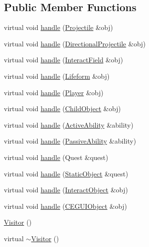 \subsection*{Public Member Functions}
\begin{DoxyCompactItemize}
\item 
virtual void \hyperlink{classZeta_1_1Visitor_aeed96aa1f8a5a6e41c27fc975971a2f8}{handle} (\hyperlink{classZeta_1_1Projectile}{Projectile} \&obj)
\item 
virtual void \hyperlink{classZeta_1_1Visitor_af0c8252665ba1a933f0c6e197c35af27}{handle} (\hyperlink{classZeta_1_1DirectionalProjectile}{Directional\+Projectile} \&obj)
\item 
virtual void \hyperlink{classZeta_1_1Visitor_a3d9eb8fcc5345717e7bca30020bb2d76}{handle} (\hyperlink{classZeta_1_1InteractField}{Interact\+Field} \&obj)
\item 
virtual void \hyperlink{classZeta_1_1Visitor_a4548e3dde9b14b28026c9d081dcb6b75}{handle} (\hyperlink{classZeta_1_1Lifeform}{Lifeform} \&obj)
\item 
virtual void \hyperlink{classZeta_1_1Visitor_ad7030244adc72eaafdd98ebaade80a71}{handle} (\hyperlink{classZeta_1_1Player}{Player} \&obj)
\item 
virtual void \hyperlink{classZeta_1_1Visitor_a666ca53f720ba2b25c9921204db2a20e}{handle} (\hyperlink{classZeta_1_1ChildObject}{Child\+Object} \&obj)
\item 
virtual void \hyperlink{classZeta_1_1Visitor_a40df72507cd6a4b78cfc18088b58114a}{handle} (\hyperlink{classZeta_1_1ActiveAbility}{Active\+Ability} \&ability)
\item 
virtual void \hyperlink{classZeta_1_1Visitor_a17eb0f1fcc19d736c924956cf2341540}{handle} (\hyperlink{classZeta_1_1PassiveAbility}{Passive\+Ability} \&ability)
\item 
virtual void \hyperlink{classZeta_1_1Visitor_a16ad95ad9f48f4ec815a3a22b0e4e671}{handle} (Quest \&quest)
\item 
virtual void \hyperlink{classZeta_1_1Visitor_addfd889be4d893b5cbc59b66a3faee95}{handle} (\hyperlink{classZeta_1_1StaticObject}{Static\+Object} \&quest)
\item 
virtual void \hyperlink{classZeta_1_1Visitor_ae41fd2c4307a2d4347dd85b372d4c681}{handle} (\hyperlink{classZeta_1_1InteractObject}{Interact\+Object} \&obj)
\item 
virtual void \hyperlink{classZeta_1_1Visitor_afe3d4bd59237c4194c499e63e0079194}{handle} (\hyperlink{classZeta_1_1CEGUIObject}{C\+E\+G\+U\+I\+Object} \&obj)
\item 
\hyperlink{classZeta_1_1Visitor_af32de06d27b38fb7683c2abc233a529b}{Visitor} ()
\item 
virtual \hyperlink{classZeta_1_1Visitor_a467f352b3719d05f32ac5964749507e5}{$\sim$\+Visitor} ()
\end{DoxyCompactItemize}


